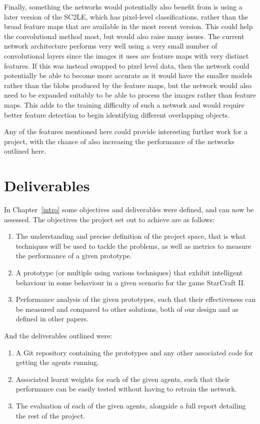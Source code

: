 Finally, something the networks would potentially also benefit from is using a
later version of the SC2LE, which has pixel-level classifications, rather than
the broad feature maps that are available in the most recent version. This could
help the convolutional method most, but would also raise many issues. The
current network architecture performs very well using a very small number of
convolutional layers since the images it uses are feature maps with very
distinct features. If this was instead swapped to pixel level data, then the
network could potentially be able to become more accurate as it would have the
smaller models rather than the blobs produced by the feature maps, but the
network would also need to be expanded suitably to be able to process the images
rather than feature maps. This adds to the training difficulty of such a network
and would require better feature detection to begin identifying different
overlapping objects.

Any of the features mentioned here could provide interesting further work for
a project, with the chance of also increasing the performance of the networks
outlined here.

\section{Deliverables}

In Chapter~\ref{intro} some objectives and deliverables were defined, and
can now be assessed. The objectives the project set out to achieve are as
follows:

\begin{enumerate}
    \item The understanding and precise definition of the project space, that is
        what techniques will be used to tackle the problems, as well as metrics
        to measure the performance of a given prototype.
    \item A prototype (or multiple using various techniques) that exhibit
        intelligent behaviour in some behaviour in a given scenario for
        the game StarCraft II\@.
    \item Performance analysis of the given prototypes, such that their
        effectiveness can be measured and compared to other solutions, both of
        our design and as defined in other papers.
\end{enumerate}

And the deliverables outlined were:

\begin{enumerate}
    \item A Git repository containing the prototypes and any other associated
        code for getting the agents running.
    \item Associated learnt weights for each of the given agents, such that
        their performance can be easily tested without having to retrain
        the network.
    \item The evaluation of each of the given agents, alongside a full report
        detailing the rest of the project.
\end{enumerate}

